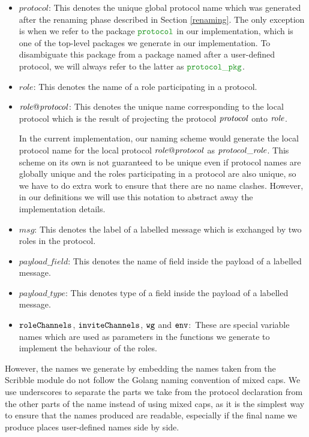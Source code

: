 \documentclass[12pt,twoside]{report}
\begin{document}
\begin{itemize}
    \item $\mathit{protocol}$: This denotes the unique global protocol name which was generated after the renaming phase described in Section \ref{renaming}. The only exception is when we refer to the package $\pkgname{protocol}$ in our implementation, which is one of the top-level packages we generate in our implementation. To disambiguate this package from a package named after a user-defined protocol, we will always refer to the latter as $\pkgname{protocol\_pkg}$.

    \item $\mathit{role}$: This denotes the name of a role participating in a protocol.

    \item $\mathit{\localprotocol{role}{protocol}}$: This denotes the unique name corresponding to the local protocol which is the result of projecting the protocol $\protocolname{protocol}$ onto $\rolename{role}$.
    
    In the current implementation, our naming scheme would generate the local protocol name for the local protocol $\mathit{\localprotocol{role}{protocol}}$ as $\localprotocolname{role}{protocol}$. This scheme on its own is not guaranteed to be unique even if protocol names are globally unique and the roles participating in a protocol are also unique, so we have to do extra work to ensure that there are no name clashes. However, in our definitions we will use this notation to abstract away the implementation details.

    \item $\mathit{msg}$: This denotes the label of a labelled message which is exchanged by two roles in the protocol.
    
    \item $\mathit{payload\_field}$: This denotes the name of field inside the payload of a labelled message.
    
    \item $\mathit{payload\_type}$: This denotes type of a field inside the payload of a labelled message.
    \item $\varname{roleChannels}$, $\varname{inviteChannels}$, $\varname{wg}$ and $\varname{env}$:\, These are special variable names which are used as parameters in the functions we generate to implement the behaviour of the roles.
\end{itemize}

However, the names we generate by embedding the names taken from the Scribble module do not follow the Golang naming convention of mixed caps. We use underscores to separate the parts we take from the protocol declaration from the other parts of the name instead of using mixed caps, as it is the simplest way to ensure that the names produced are readable, especially if the final name we produce places user-defined names side by side.
\end{document}
